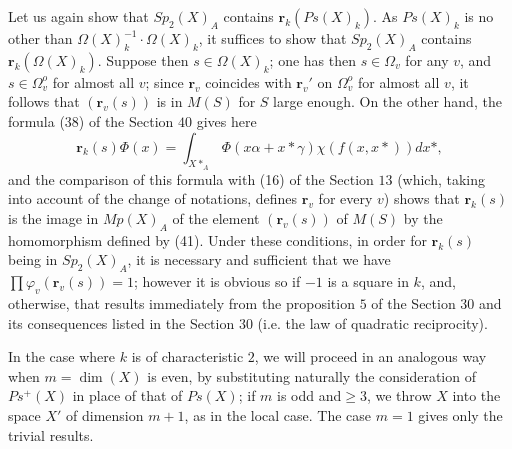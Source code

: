 \documentclass[12pt]{amsart}
\begin{document}
Let us again show that $Sp_{2}(X)_{A}$ contains $\mathbf{r}_{k}(Ps(X)_{k})$.
As $Ps(X)_{k}$ is no other than $\Omega(X)_{k}^{-1}\cdot\Omega(X)_{k}$,
it suffices to show that $Sp_{2}(X)_{A}$ contains $\mathbf{r}_{k}(\Omega(X)_{k})$.
Suppose then $s\in\Omega(X)_{k}$; one has then $s\in\Omega_{v}$
for any $v$, and $s\in\Omega_{v}^{o}$ for almost all $v$; since
$\mathbf{r}_{v}$ coincides with $\mathbf{r}_{v}'$ on $\Omega_{v}^{o}$
for almost all $v$, it follows that $(\mathbf{r}_{v}(s))$ is in
$M(S)$ for $S$ large enough. On the other hand, the formula (38)
of the Section $40$ gives here\[
\mathbf{r}_{k}(s)\Phi(x)=\int_{X*_{A}}\Phi(x\alpha+x*\gamma)\chi(f(x,x*))dx*,\]
and the comparison of this formula with (16) of the Section $13$
(which, taking into account of the change of notations, defines $\mathbf{r}_{v}$
for every $v$) shows that $\mathbf{r}_{k}(s)$ is the image in $Mp(X)_{A}$
of the element $(\mathbf{r}_{v}(s))$ of $M(S)$ by the homomorphism
defined by (41). Under these conditions, in order for $\mathbf{r}_{k}(s)$
being in $Sp_{2}(X)_{A}$, it is necessary and sufficient that we
have $\prod\varphi_{v}(\mathbf{r}_{v}(s))=1$; however it is obvious
so if $-1$ is a square in $k$, and, otherwise, that results immediately
from the proposition $5$ of the Section $30$ and its consequences
listed in the Section $30$ (i.e. the law of quadratic reciprocity).

In the case where $k$ is of characteristic $2$, we will proceed
in an analogous way when $m=\dim(X)$ is even, by substituting naturally
the consideration of $Ps^{+}(X)$ in place of that of $Ps(X)$; if
$m$ is odd and$\geq3$, we throw $X$ into the space $X'$ of dimension
$m+1$, as in the local case. The case $m=1$ gives only the trivial
results.
\end{document}
